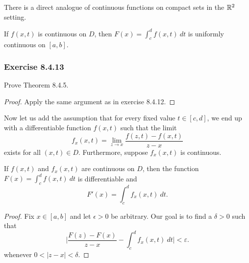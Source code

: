 There is a direct analogue of continuous functions on compact sets in the \( \mathbb{R}^{2} \) setting.

\begin{theorem}
    If \( f(x,t)  \) is continuous on \( D  \), then \( F(x) = \int_{ c }^{ d } f(x,t) \ dt \) is uniformly continuous on \( [a,b]  \).
\end{theorem}

\subsubsection{Exercise 8.4.13} Prove Theorem 8.4.5. 

\begin{proof}
Apply the same argument as in exercise 8.4.12.
\end{proof}

Now let us add the assumption that for every fixed value \( t \in [c,d] \), we end up with a differentiable function \( f(x,t) \) such that the limit
\[  f_{x}(x,t) = \lim_{ z \to x }  \frac{ f(z,t) - f(x,t)  }{  z -x  }  \] 
exists for all \( (x,t) \in D  \). Furthermore, suppose \( f_{x}(x,t)  \) is continuous.

\begin{theorem}
    If \( f(x,t)  \) and \( f_{x}(x,t)  \) are continuous on \( D  \), then the function \( F(x) = \int_{ c }^{ d }  f(x,t) \ dt    \) is differentiable and 
    \[  F'(x) = \int_{ c }^{ d } f_{x}(x,t) \ dt. \]
\end{theorem}

\begin{proof}
    Fix \( x \in [a,b]  \) and let \( \epsilon > 0  \) be arbitrary. Our goal is to find a \( \delta > 0  \) such that 
    \[  \Big| \frac{ F(z) - F(x)  }{ z -x  }  - \int_{ c }^{ d }  f_{x}(x,t) \ dt \Big| < \varepsilon. \tag{5} \]
    whenever \( 0 < | z  -x  | < \delta  \).
\end{proof}


